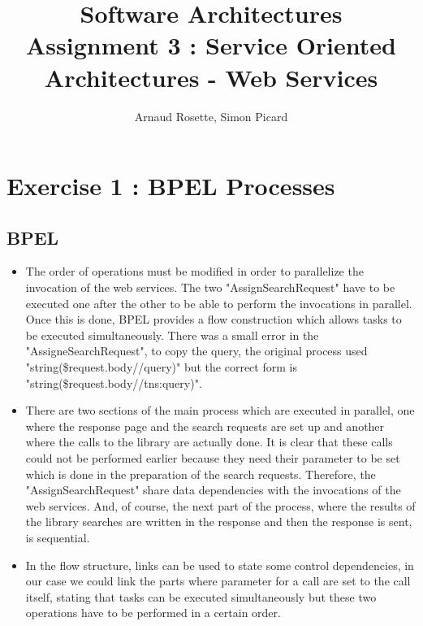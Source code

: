 \documentclass[a4paper,10pt]{article}
\title{Software Architectures\\ Assignment 3 : Service Oriented Architectures - Web Services}
\author{Arnaud Rosette, Simon Picard}
\begin{document}
\maketitle
\section{Exercise 1 : BPEL Processes}
\subsection{BPEL}
\begin{itemize}
\item The order of operations must be modified in order to parallelize the invocation of the web services. The two "AssignSearchRequest" have to be executed one  after the other to be able to perform the invocations in parallel. Once this is done, BPEL provides a flow construction which allows tasks to be executed simultaneously. There was a small error in the "AssigneSearchRequest", to copy the query, the original process used "string(\$request.body//query)" but the correct form is "string(\$request.body//tns:query)".\\

\item There are two sections of the main process which are executed in parallel, one where the response page and the search requests are set up and another where the calls to the library are actually done. It is clear that these calls could not be performed earlier because they need their parameter to be set which is done in the preparation of the search requests. Therefore, the "AssignSearchRequest" share data dependencies with the invocations of the web services. And, of course, the next part of the process, where the results of the library searches are written in the response and then the response is sent, is sequential.\\

\item In the flow structure, links can be used to state some control dependencies, in our case we could link the parts where parameter for a call are set to the call itself, stating that tasks can be executed simultaneously but these two operations have to be performed in a certain order.
\end{itemize}
\end{document}
